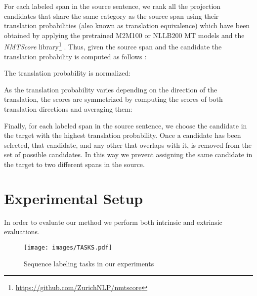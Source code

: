 \documentclass[11pt]{article}
\begin{document}
For each labeled span in the source sentence, we rank all the projection
candidates that share the same category as the source span using their
translation probabilities (also known as translation equivalence) which have
been obtained by
applying the pretrained M2M100 \cite{DBLP:journals/jmlr/FanBSMEGBCWCGBL21} or NLLB200 \cite{DBLP:journals/corr/abs-2207-04672} MT models
 and the \textit{NMTScore}
library\footnote{\url{https://github.com/ZurichNLP/nmtscore}}
\cite{DBLP:journals/corr/abs-2204-13692}. Thus, given the source span 
and the candidate  the translation probability is computed as
follows \cite{DBLP:journals/corr/abs-2204-13692}:

\begin{center}
  
  \end{center}


\noindent The translation probability is normalized:

\begin{center}

\end{center}

As the translation probability varies depending on the direction of the
translation, the scores are symmetrized by computing the scores of both translation directions and averaging them:

\begin{center}
    
\end{center}

Finally, for each labeled span in the source sentence, we choose the candidate
in the target with the highest translation probability. Once a candidate has
been selected, that candidate, and any other that overlaps with it, is
removed from the set of possible candidates. In this way we prevent assigning
the same candidate in the target to two different spans in the source.

\section{Experimental Setup}\label{sec:Methodology}

In order to evaluate our method we perform both intrinsic and extrinsic evaluations. 



\begin{figure*}[htb]
    \centering
    \texttt{[image: images/TASKS.pdf]}
    \caption{Sequence labeling tasks in our experiments}
    \label{fig:Tasks}
\end{figure*}
\end{document}
